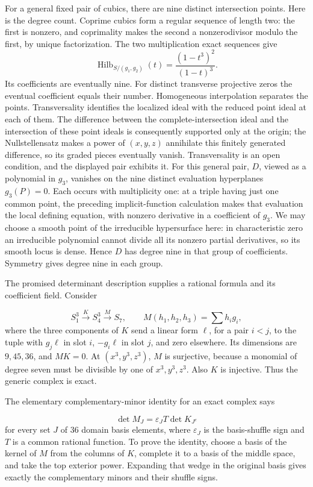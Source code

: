 \documentclass[
]{article}
\begin{document}
For a general fixed pair of cubics, there are nine distinct intersection
points. Here is the degree count. Coprime cubics form a regular sequence
of length two: the first is nonzero, and coprimality makes the second a
nonzerodivisor modulo the first, by unique factorization. The two
multiplication exact sequences give \[
\operatorname{Hilb}_{S/(g_1,g_2)}(t)=\frac{(1-t^3)^2}{(1-t)^3}.
\] Its coefficients are eventually nine. For distinct transverse
projective zeros the eventual coefficient equals their number.
Homogeneous interpolation separates the points. Transversality
identifies the localized ideal with the reduced point ideal at each of
them. The difference between the complete-intersection ideal and the
intersection of these point ideals is consequently supported only at the
origin; the Nullstellensatz makes a power of \((x,y,z)\) annihilate this
finitely generated difference, so its graded pieces eventually vanish.
Transversality is an open condition, and the displayed pair exhibits it.
For this general pair, \(D\), viewed as a polynomial in \(g_3\),
vanishes on the nine distinct evaluation hyperplanes \(g_3(P)=0\). Each
occurs with multiplicity one: at a triple having just one common point,
the preceding implicit-function calculation makes that evaluation the
local defining equation, with nonzero derivative in a coefficient of
\(g_3\). We may choose a smooth point of the irreducible hypersurface
here: in characteristic zero an irreducible polynomial cannot divide all
its nonzero partial derivatives, so its smooth locus is dense. Hence
\(D\) has degree nine in that group of coefficients. Symmetry gives
degree nine in each group.

The promised determinant description supplies a rational formula and its
coefficient field. Consider
\protect{}\label{equation-B30}{}

\[
S_1^3\xrightarrow{K}S_4^3\xrightarrow{M}S_7,
\qquad M(h_1,h_2,h_3)=\sum h_ig_i,
\tag{B30}
\] where the three components of \(K\) send a linear form \(\ell\), for
a pair \(i<j\), to the tuple with \(g_j\ell\) in slot \(i\),
\(-g_i\ell\) in slot \(j\), and zero elsewhere. Its dimensions are
\(9,45,36\), and \(MK=0\). At \((x^3,y^3,z^3)\), \(M\) is surjective,
because a monomial of degree seven must be divisible by one of
\(x^3,y^3,z^3\). Also \(K\) is injective. Thus the generic complex is
exact.

The elementary complementary-minor identity for an exact complex says
\protect{}\label{equation-B31}{}

\[
\det M_J=\varepsilon_J T\det K_{J^c}
\tag{B31}
\] for every set \(J\) of 36 domain basis elements, where
\(\varepsilon_J\) is the basis-shuffle sign and \(T\) is a common
rational function. To prove the identity, choose a basis of the kernel
of \(M\) from the columns of \(K\), complete it to a basis of the middle
space, and take the top exterior power. Expanding that wedge in the
original basis gives exactly the complementary minors and their shuffle
signs.
\end{document}
